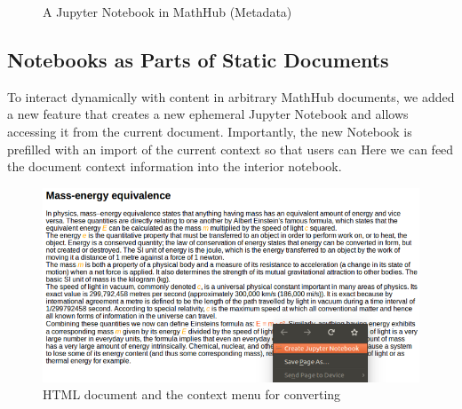 \begin{oldpart}
\begin{figure}[ht]\centering
  \caption{A Jupyter Notebook in MathHub (Metadata)}\label{fig:mathhub-NB}
\end{figure}

\end{oldpart}

\subsection{Notebooks as Parts of Static Documents}

To interact dynamically with content in arbitrary MathHub documents, we added a new feature that creates a new ephemeral Jupyter Notebook and allows accessing it from the current document.
Importantly, the new Notebook is prefilled with an import of the current context so that users can Here we can feed the document context information into the interior notebook.

\begin{figure}[ht]\centering
  \includegraphics[width=15cm]{../D4.11/conversionHTML}
  \caption{HTML document and the context menu for converting}\label{fig:conversionHTML}
\end{figure}


